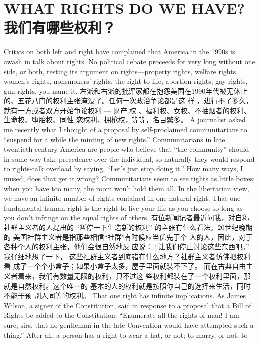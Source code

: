 \chapter{WHAT RIGHTS DO WE HAVE?\\我们有哪些权利？}
\begin{paracol}{2}

Critics on both left and right have complained that America in the 1990s is awash in talk about rights. No political debate proceeds for very long without one side, or both,
resting its argument on rights---property rights, welfare rights,
women's rights, nonsmokers' rights, the right to life, abortion
rights, gay rights, gun rights, you name it.
\switchcolumn
左派和右派的批评家都在抱怨美国在1990年代被无休止
的、五花八门的权利主张淹没了。任何一次政治争论都是这
样 ，进行不了多久，就有一方或者双方开始争论权利 --- 财产
权 、福利权、女权、不抽烟者的权利、生命权、堕胎权、同性
恋权利、拥枪权，等等，名目繁多。
\switchcolumn*
A journalist asked me recently what I thought of a proposal
by self-proclaimed communitarians to ``suspend for a while the
minting of new rights.'' Communitarians in late twentieth-century America are people who believe that ``the community''
should in some way take precedence over the individual, so naturally they would respond to rights-talk overload by saying,
``Let's just stop doing it.'' How many ways, I mused, does that
get it wrong? Communitarians seem to see rights as little boxes;
when you have too many, the room won't hold them all. In the
libertarian view, we have an infinite number of rights contained
in one natural right. That one fundamental human right is the
right to live your life as you choose so long as you don't infringe
on the equal rights of others.
\switchcolumn
有位新闻记者最近问我，对自称社群主义者的人提出的
“暂停一下生造新的权利” 的主张有什么看法。20世纪晚期的
美国社群主义者是指那些相信“社群”有时候应当优先于个
人的人，因此，对于各种个人的权利主张，他们会很自然地反
应说： “让我们停止讨论这些东西吧。” 我仔细地想了一下，
这些社群主义者到底错在什么地方？社群主义者仿佛把权利看
成了一个个小盒子；如果小盒子太多，屋子里面就装不下了。
而在古典自由主义者着来，我们有数量无限的权利，只不过这
些权利都装在了一个权利里面，那就是自然权利。这个唯一的
基本的人的权利就是按照你自己的选择来生活，同时不能干预
别人同等的权利。
\switchcolumn*
That one right has infinite implications. As James Wilson, a
signer of the Constitution, said in response to a proposal that a
Bill of Rights be added to the Constitution: ``Enumerate all the
rights of man! I am sure, sirs, that no gentleman in the late Convention would have attempted such a thing.'' After all, a person has a right to wear a hat, or not; to marry, or not; to

\end{paracol}
